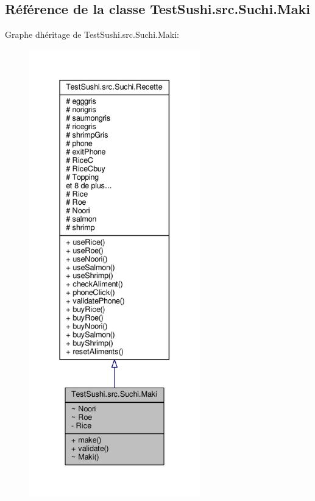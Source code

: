 \hypertarget{classTestSushi_1_1src_1_1Suchi_1_1Maki}{}\subsection{Référence de la classe Test\+Sushi.\+src.\+Suchi.\+Maki}
\label{classTestSushi_1_1src_1_1Suchi_1_1Maki}


Graphe d\textquotesingle{}héritage de Test\+Sushi.\+src.\+Suchi.\+Maki\+:\nopagebreak
\begin{figure}[H]
\begin{center}
\leavevmode
\includegraphics[height=550pt]{classTestSushi_1_1src_1_1Suchi_1_1Maki__inherit__graph}
\end{center}
\end{figure}


